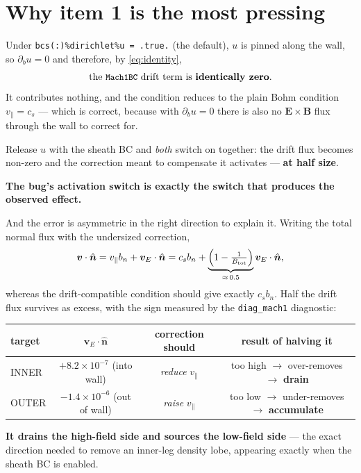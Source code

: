 \documentclass[11pt,a4paper]{article}
\newcommand{\code}[1]{\texttt{\small #1}}
\newcommand{\vE}{\bm v_E}\newcommand{\nhat}{\hat{\bm n}}\newcommand{\that}{\hat{\bm t}}
\begin{document}
\section{Why item 1 is the most pressing}

\begin{keybox}
Under \code{bcs(:)\%dirichlet\%u = .true.} (the default), $u$ is pinned along the wall, so
$\partial_b u = 0$ and therefore, by \eqref{eq:identity},
\[
   \text{the \code{Mach1BC} drift term is \textbf{identically zero}.}
\]
It contributes nothing, and the condition reduces to the plain Bohm condition
$v_\parallel = c_s$ --- which is correct, because with $\partial_b u = 0$ there is also no
$\bm E\times\bm B$ flux through the wall to correct for.

Release $u$ with the sheath BC and \emph{both} switch on together: the drift flux becomes
non-zero and the correction meant to compensate it activates --- \textbf{at half size}.

\textbf{The bug's activation switch is exactly the switch that produces the observed effect.}
\end{keybox}

\noindent And the error is asymmetric in the right direction to explain it. Writing the total
normal flux with the undersized correction,
\begin{equation}
  \bm v\cdot\nhat = v_\parallel b_n + \vE\cdot\nhat
  = c_s b_n + \underbrace{\Bigl(1-\tfrac{1}{B_{\rm tot}}\Bigr)}_{\approx\,0.5}\vE\cdot\nhat ,
\end{equation}
whereas the drift-compatible condition should give exactly $c_s b_n$. Half the drift flux
survives as excess, with the sign measured by the \code{diag\_mach1} diagnostic:

\begin{center}
\begin{tabular}{lccc}
\toprule
target & $\vE\!\cdot\!\nhat$ & correction should & result of halving it \\
\midrule
INNER & $+8.2\times10^{-7}$ (into wall) & \emph{reduce} $v_\parallel$ & too high $\to$ over-removes $\to$ \textbf{drain} \\
OUTER & $-1.4\times10^{-6}$ (out of wall) & \emph{raise} $v_\parallel$ & too low $\to$ under-removes $\to$ \textbf{accumulate} \\
\bottomrule
\end{tabular}
\end{center}

\noindent\textbf{It drains the high-field side and sources the low-field side} --- the exact
direction needed to remove an inner-leg density lobe, appearing exactly when the sheath BC
is enabled.
\end{document}
